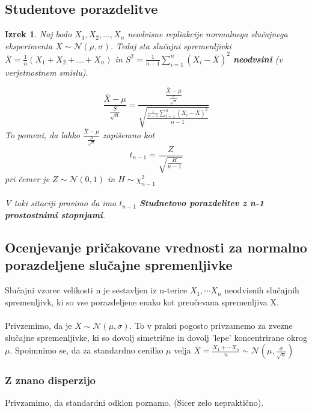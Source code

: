 \documentclass[11pt]{article}
\newtheorem{Izrek}{{\sc Izrek}}[section]
\begin{document}
\subsection{Studentove porazdelitve}
\begin{Izrek}
	Naj bodo  $X_1, X_2, \ldots , X_n$ neodvisne repliakcije normalnega slučajnega eksperimenta $X\sim \mathcal{N}(\mu,\sigma)$. Tedaj sta slučajni spremenljivki $\bar{X} = \frac{1}{n}(X_1 + X_2 + \ldots + X_n)$ in $S^2 =\frac{1}{n-1}\sum_{i = 1}^{n}{(X_i - \bar{X})^2}$ \textbf{neodvsini} (v verjetnostnem smislu).
	
	$$\frac{\bar{X}-\mu}{\frac{S}{\sqrt{n}}} = \frac{\frac{\bar{X}-\mu}{\frac{\sigma}{\sqrt{n}}}}{\sqrt{\frac{\frac{1}{n-1}\sum_{i = 1}^{n}{(X_i - \bar{X})^2}}{n-1}}}$$
	To pomeni, da lahko $\frac{\bar{X}-\mu}{\frac{S}{\sqrt{n}}}$ zapišemno kot $$t_{n-1} = \frac{Z}{\sqrt{\frac{H}{n-1}}}$$
	pri čemer je $Z\sim \mathcal{N}(0,1)$ in $H \sim \chi_{n-1}^2$
	\\
	\\
	V taki sitaciji pravimo da ima  $t_{n-1} $ \textbf{Studnetovo porazdelitev z n-1 prostostnimi stopnjami}.
\end{Izrek}
\subsection{Ocenjevanje pričakovane vrednosti za normalno porazdeljene slučajne spremenljivke}
Slučajni vzorec velikosti n je sestavljen iz n-terice $X_1,\cdots X_n$ neodvisnih slučajnih spremenljivk, ki so vse porazdeljene enako kot preučevana spremenljiva X.
\\
\\
Privzemimo, da je $X\sim \mathcal{N}(\mu, \sigma)$. To v praksi pogosto privzamemo za zvezne slučajne spremenljivke, ki so dovolj simetrične in dovolj 'lepe' koncentrirane okrog $\mu$. Spoimnimo se, da za standardno cenilko $\mu$ velja $\bar{X} = \frac{X_1 + \cdots X_n}{n}\sim \mathcal{N}(\mu, \frac{\sigma}{\sqrt{n}})$

\subsubsection{Z znano disperzijo}
Privzamimo, da standardni odklon poznamo. (Sicer zelo nepraktično).
\end{document}
